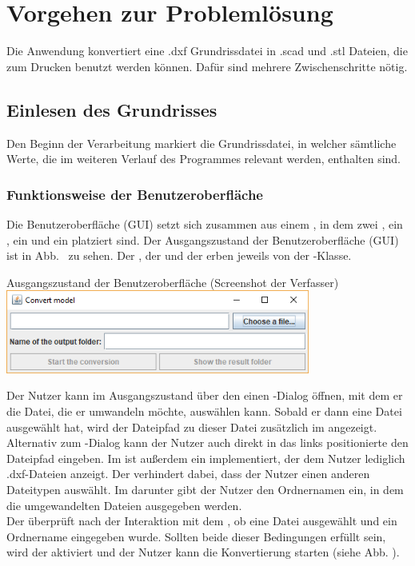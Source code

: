 \chapter{Vorgehen zur Problemlösung}
Die Anwendung konvertiert eine .dxf Grundrissdatei in .scad und .stl Dateien, die zum Drucken benutzt werden können.
Dafür sind mehrere Zwischenschritte nötig.
\section{Einlesen des Grundrisses}
Den Beginn der Verarbeitung markiert die Grundrissdatei, in welcher sämtliche Werte, die im weiteren Verlauf des Programmes relevant werden, enthalten sind.

\subsection{Funktionsweise der Benutzeroberfläche}
Die Benutzeroberfläche (GUI) setzt sich zusammen aus einem , in dem zwei , ein , ein  und ein  platziert sind.
Der Ausgangszustand der Benutzeroberfläche (GUI) ist in Abb. \thebildnrnext\ zu sehen.
Der , der  und der  erben jeweils von der -Klasse. \\

\begin{Bild}{Ausgangszustand der Benutzeroberfläche (Screenshot der Verfasser)}
	\includegraphics[width = 100mm]{Bilder/GUI/GUI_Startup}
\end{Bild}

Der Nutzer kann im Ausgangszustand über den  einen -Dialog öffnen, mit dem er die Datei, die er umwandeln möchte, auswählen kann.
Sobald er dann eine Datei ausgewählt hat, wird der Dateipfad zu dieser Datei zusätzlich im  angezeigt.
Alternativ zum -Dialog kann der Nutzer auch direkt in das links positionierte  den Dateipfad eingeben.
Im  ist außerdem ein  implementiert, der dem Nutzer lediglich .dxf-Dateien anzeigt.
Der  verhindert dabei, dass der Nutzer einen anderen Dateitypen auswählt.
Im  darunter gibt der Nutzer den Ordnernamen ein, in dem die umgewandelten Dateien ausgegeben werden. \\
Der  überprüft nach der Interaktion mit dem , ob eine Datei ausgewählt und ein Ordnername eingegeben wurde.
Sollten beide dieser Bedingungen erfüllt sein, wird der  aktiviert und der Nutzer kann die Konvertierung starten (siehe Abb. \thebildnrnext).\\


